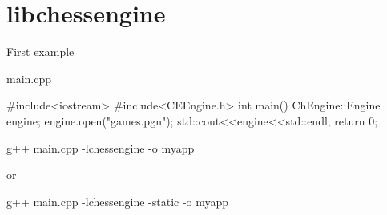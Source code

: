 \hypertarget{libchessengine-example}{
\section{libchessengine}
}
First example 
\begin{DoxyCode}
 main.cpp

#include<iostream>
#include<CEEngine.h>
int main()
{
    ChEngine::Engine engine;
    engine.open("games.pgn");
    std::cout<<engine<<std::endl;
    return 0;
}
\end{DoxyCode}


g++ main.cpp -\/lchessengine -\/o myapp

or

g++ main.cpp -\/lchessengine -\/static -\/o myapp


\begin{DoxyCodeInclude}
\end{DoxyCodeInclude}
 